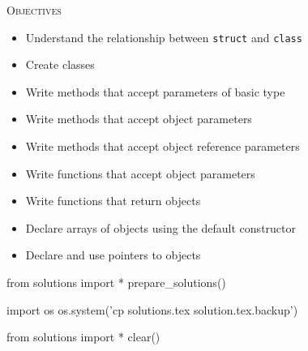 
\textsc{Objectives}
\begin{itemize}
\item Understand the relationship between \texttt{struct} and \texttt{class}
\item Create classes
\item Write methods that accept parameters of basic type
\item Write methods that accept object parameters
\item Write methods that accept object reference parameters
\item Write functions that accept object parameters
\item Write functions that return objects
\item Declare arrays of objects using the default constructor
\item Declare and use pointers to objects
\end{itemize}














\begin{python0}
from solutions import *
prepare_solutions()
\end{python0}
\begin{python}
import os
os.system('cp solutions.tex solution.tex.backup')  
\end{python}

\begin{python0}
from solutions import *
clear()
\end{python0}
